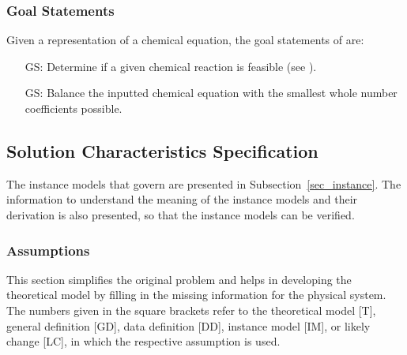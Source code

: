 \documentclass[12pt]{article}
\newcounter{goalnum} %
\begin{document}
\subsubsection{Goal Statements} \label{sec_goals}
Given a representation of a chemical equation, the goal statements 
of \progname{} are:

\begin{itemize}

\item[GS\refstepcounter{goalnum}\thegoalnum \label{G_feasible}:] Determine if
a given chemical reaction is feasible (see ).

\item[GS\refstepcounter{goalnum}\thegoalnum \label{G_balance}:] Balance the
inputted chemical equation with the smallest whole number coefficients
possible.

\end{itemize}

\subsection{Solution Characteristics Specification}

%
%

The instance models that govern \progname{} are presented in
Subsection~\ref{sec_instance}.  The information to understand the meaning of the
instance models and their derivation is also presented, so that the instance
models can be verified.

\subsubsection{Assumptions} \label{sec_assumpt}

This section simplifies the original problem and helps in developing the
theoretical model by filling in the missing information for the physical
system. The numbers given in the square brackets refer to the theoretical model
[T], general definition [GD], data definition [DD], instance model [IM], or
likely change [LC], in which the respective assumption is used.
\end{document}
